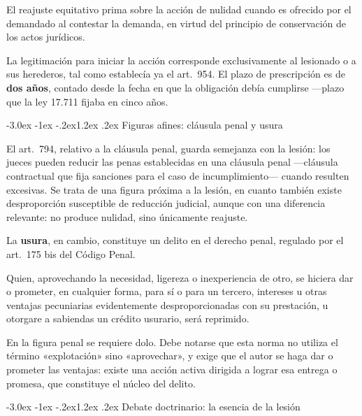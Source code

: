 \documentclass[12pt,oneside]{book}
\makeatletter
\renewcommand\section{\@startsection{section}{1}{\z@}%
  {-3.0ex \@plus -1ex \@minus -.2ex}{1.2ex \@plus .2ex}%
  {\normalfont\large\bfseries\color{acento}}}
\makeatother
\begin{document}
\begin{importante}
El reajuste equitativo prima sobre la acción de nulidad cuando es ofrecido por el demandado al contestar la demanda, en virtud del principio de conservación de los actos jurídicos.
\end{importante}

La legitimación para iniciar la acción corresponde exclusivamente al lesionado o a sus herederos, tal como establecía ya el art.\ 954. El plazo de prescripción es de \textbf{dos años}, contado desde la fecha en que la obligación debía cumplirse ---plazo que la ley 17.711 fijaba en cinco años.

\section{Figuras afines: cláusula penal y usura}

El art.\ 794, relativo a la cláusula penal, guarda semejanza con la lesión: los jueces pueden reducir las penas establecidas en una cláusula penal ---cláusula contractual que fija sanciones para el caso de incumplimiento--- cuando resulten excesivas. Se trata de una figura próxima a la lesión, en cuanto también existe desproporción susceptible de reducción judicial, aunque con una diferencia relevante: no produce nulidad, sino únicamente reajuste.

La \textbf{usura}, en cambio, constituye un delito en el derecho penal, regulado por el art.\ 175 bis del Código Penal.

\begin{regla}
Quien, aprovechando la necesidad, ligereza o inexperiencia de otro, se hiciera dar o prometer, en cualquier forma, para sí o para un tercero, intereses u otras ventajas pecuniarias evidentemente desproporcionadas con su prestación, u otorgare a sabiendas un crédito usurario, será reprimido.
\end{regla}

En la figura penal se requiere dolo. Debe notarse que esta norma no utiliza el término «explotación» sino «aprovechar», y exige que el autor se haga dar o prometer las ventajas: existe una acción activa dirigida a lograr esa entrega o promesa, que constituye el núcleo del delito.

\section{Debate doctrinario: la esencia de la lesión}
\end{document}
